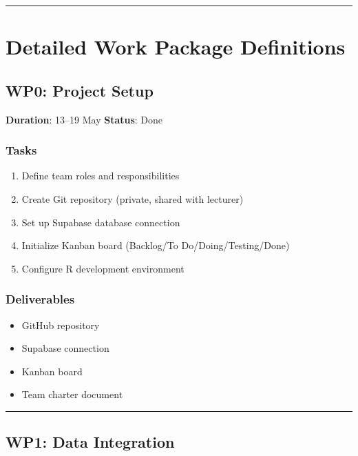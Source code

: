 \documentclass[
  english,
  letterpaper,
  DIV=11,
  numbers=noendperiod]{scrreprt}
\providecommand{\tightlist}{%
  \setlength{\itemsep}{0pt}\setlength{\parskip}{0pt}}
\begin{document}
\begin{center}\rule{0.5\linewidth}{0.5pt}\end{center}

\section{Detailed Work Package
Definitions}\label{detailed-work-package-definitions}

\subsection{WP0: Project Setup}\label{wp0-project-setup}

\textbf{Duration}: 13--19 May \textbar{} \textbf{Status}: Done

\subsubsection{Tasks}\label{tasks}

\begin{enumerate}
\def\labelenumi{\arabic{enumi}.}
\tightlist
\item
  Define team roles and responsibilities
\item
  Create Git repository (private, shared with lecturer)
\item
  Set up Supabase database connection
\item
  Initialize Kanban board (Backlog/To Do/Doing/Testing/Done)
\item
  Configure R development environment
\end{enumerate}

\subsubsection{Deliverables}\label{deliverables}

\begin{itemize}
\tightlist
\item
  GitHub repository
\item
  Supabase connection
\item
  Kanban board
\item
  Team charter document
\end{itemize}

\begin{center}\rule{0.5\linewidth}{0.5pt}\end{center}

\subsection{WP1: Data Integration}\label{wp1-data-integration}
\end{document}
